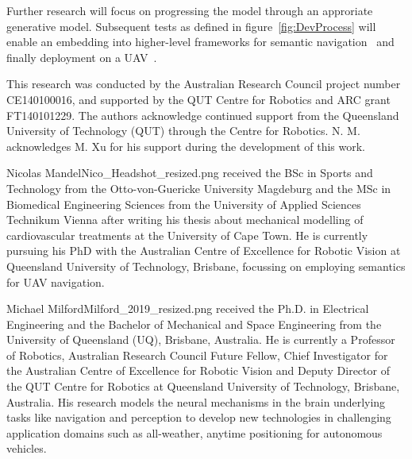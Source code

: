 \documentclass[twocolumn,letterpaper]{IEEEAerospaceCLS}  %
\begin{document}
Further research will focus on progressing the model through an approriate generative model. Subsequent tests as defined in figure~\ref{fig:DevProcess} will enable an embedding into higher-level frameworks for semantic navigation~\cite{mandel_towards_2020,vanegas_uncertainty_2016} and finally deployment on a UAV~\cite{mandel_method_2020}.

\acknowledgments
This research was conducted by the Australian Research Council project number CE140100016, and supported by the QUT Centre for Robotics and ARC grant FT140101229. The authors acknowledge continued support from the Queensland University of Technology (QUT) through the Centre for Robotics. N. M. acknowledges M. Xu for his support during the development of this work.






\thebiography
\begin{biographywithpic}{Nicolas Mandel}{Nico_Headshot_resized.png}
    received the BSc in Sports and Technology from the Otto-von-Guericke University Magdeburg and the MSc in Biomedical Engineering Sciences from the University of Applied Sciences Technikum Vienna after writing his thesis about mechanical modelling of cardiovascular treatments at the University of Cape Town. He is currently pursuing his PhD with the Australian Centre of Excellence for Robotic Vision at Queensland University of Technology, Brisbane, focussing on employing semantics for UAV navigation.
\end{biographywithpic}

\begin{biographywithpic}{Michael Milford}{Milford_2019_resized.png}
    received the Ph.D. in Electrical Engineering and the Bachelor of Mechanical and Space Engineering from the University of Queensland (UQ), Brisbane, Australia. He is currently a Professor of Robotics, Australian Research Council Future Fellow, Chief Investigator for the Australian Centre of Excellence for Robotic Vision and Deputy Director of the QUT Centre for Robotics at Queensland University of Technology, Brisbane, Australia. His research models the neural mechanisms in the brain underlying tasks like navigation and perception to develop new technologies in challenging application domains such as all-weather, anytime positioning for autonomous vehicles.
\end{biographywithpic}
\end{document}
